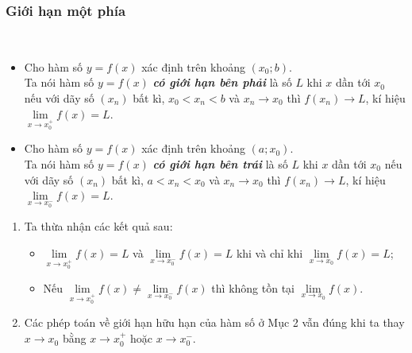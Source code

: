 \begin{tomtat}
	\subsubsection{Giới hạn một phía}
\begin{dn}
	\
	\begin{itemize}
		\item Cho hàm số $ y=f(x) $ xác định trên khoảng $ (x_0;b) $.\\
		Ta nói hàm số $ y=f(x) $ \textbf{\textit{có giới hạn bên phải}} là số $ L $ khi $ x $ dần tới $ x_0 $ nếu với dãy số $ (x_n) $ bất kì, $ x_0<x_n<b $ và $ x_n\to x_0 $ thì $ f(x_n)\to L $, kí hiệu $ \lim \limits_{x \to x_0^+} f(x) =L$.
		\item Cho hàm số $ y=f(x) $ xác định trên khoảng $ (a;x_0) $.\\
		Ta nói hàm số $ y=f(x) $ \textbf{\textit{có giới hạn bên trái}} là số $ L $ khi $ x $ dần tới $ x_0 $ nếu với dãy số $ (x_n) $ bất kì, $ a<x_n<x_0 $ và $ x_n\to x_0 $ thì $ f(x_n)\to L $, kí hiệu $ \lim \limits_{x \to x_0^-} f(x) =L$.
	\end{itemize}
\end{dn}
\begin{note} 
	\begin{enumerate}
		\item Ta thừa nhận các kết quả sau:
		\begin{itemize}
			\item $ \lim \limits_{x \to x_0^+} f(x)=L$ và $ \lim \limits_{x \to x_0^-} f(x)=L $ khi và chỉ khi $ \lim \limits_{x \to x_0} f(x) =L$;
			\item Nếu $ \lim \limits_{x \to x_0^+} f(x)\neq \lim \limits_{x \to x_0^-} f(x)$ thì không tồn tại $ \lim \limits_{x \to x_0} f(x) $.
		\end{itemize}
		\item Các phép toán về giới hạn hữu hạn của hàm số ở Mục 2 vẫn đúng khi ta thay $ x\to x_0 $ bằng $ x\to x_0^+ $ hoặc $ x\to x_0^- $.
	\end{enumerate}
\end{note}


\end{tomtat}
